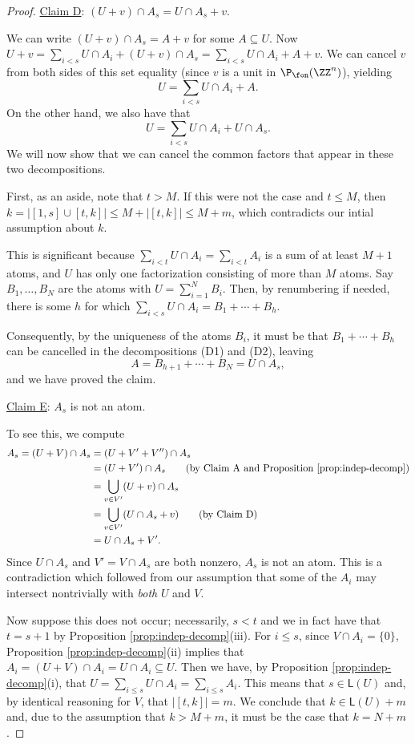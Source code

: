 \begin{proof}
\noindent\underline{Claim D}: $(U+v)\cap A_s = U\cap A_s + v$. \label{cld}
	
We can write $(U+v)\cap A_s = A + v$ for some $A \subseteq U$.
Now $U+v = \sum_{i<s} U\cap A_i + (U+v)\cap A_s = \sum_{i<s} U\cap A_i + A + v$.
We can cancel $v$ from both sides of this set equality (since $v$ is a unit in $\P_\fon(\ZZ^n)$), yielding
\[ U = \sum_{i<s} U\cap A_i + A. \tag{D1}\]
On the other hand, we also have that
\[ U = \sum_{i<s} U\cap A_i + U\cap A_s. \tag{D2}\]
We will now show that we can cancel the common factors that appear in these two decompositions.
	
First, as an aside, note that $t > M$.
If this were not the case and $t \le M$, then $k = | [ 1,s ] \cup [ t,k ] | \le M + | [ t,k ] | \le M+m$, which contradicts our intial assumption about $k$.
	
This is significant because $\sum_{i<t} U\cap A_i = \sum_{i<t} A_i$ is a sum of at least $M+1$ atoms, and $U$ has only one factorization consisting of more than $M$ atoms.
Say $B_1,\dots, B_{N}$ are the atoms with $U = \sum_{i=1}^{N} B_i$.
Then, by renumbering if needed, there is some $h$ for which $\sum_{i<s} U\cap A_i = B_1 + \cdots + B_h$.
	
Consequently, by the uniqueness of the atoms $B_i$, it must be that $B_1 +\cdots + B_h$ can be cancelled in the decompositions (D1) and (D2), leaving
\[ A = B_{h+1} +\cdots+ B_{N} = U\cap A_s, \]
and we have proved the claim.
	
\noindent\underline{Claim E}: $A_s$ is not an atom. \label{cle}
	
To see this, we compute
\begin{align*}
A_s = (U+V)\cap A_s 
&= (U+V'+V'') \cap A_s \\
&= (U+V') \cap A_s \tag{by Claim A and Proposition \ref{prop:indep-decomp}} \\
&= \bigcup_{v\in V'} (U+v)\cap A_s \\
&= \bigcup_{v\in V'} (U\cap A_s + v) \tag{by Claim D} \\
&= U\cap A_s + V'.
\end{align*}
Since $U\cap A_s$ and $V' = V\cap A_s$ are both nonzero, $A_s$ is not an atom.
This is a contradiction which followed from our assumption that some of the $A_i$ may intersect nontrivially with \textit{both} $U$ and $V$.
	
Now suppose this does not occur; necessarily, $s < t$ and we in fact have that $t = s+1$ by Proposition \ref{prop:indep-decomp}(iii).
For $i \le s$, since $V\cap A_i  = \{0\}$, Proposition \ref{prop:indep-decomp}(ii) implies that $A_i = (U+V)\cap A_i = U\cap A_i \subseteq U$.
Then we have, by Proposition \ref{prop:indep-decomp}(i), that $U = \sum_{i\le s} U\cap A_i = \sum_{i\le s} A_i$.
This means that $s\in \mathsf{L}(U)$ and, by identical reasoning for $V$, that $| [ t,k ]| = m$.
We conclude that $k \in \mathsf{L}(U) + m$ and, due to the assumption that $k>M+m$, it must be the case that $k = N + m$.
\end{proof}


